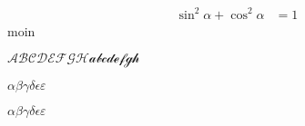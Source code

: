 \documentclass[17x24,ngerman,ulinevec]{bgteubner}
\date{heute}
\begin{document}
\begin{align}
  \sin^2\alpha + \cos^2\alpha &= 1
\end{align}
moin

$\mathcal{ABCDEFGHabcdefgh}$

$\alpha\beta\gamma\delta\epsilon\varepsilon$

{\boldmath$\alpha\beta\gamma\delta\epsilon\varepsilon$}
\end{document}
